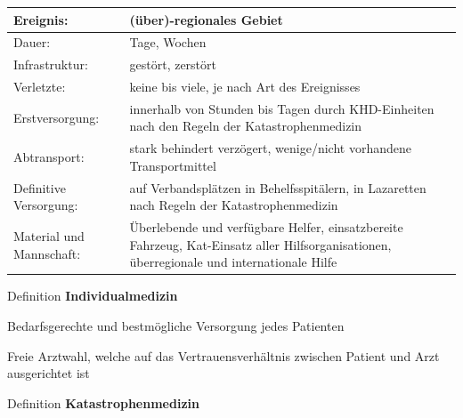 \documentclass{article}
\newcommand\gT[1]{\textbf{\textup{\textcolor[rgb]{0.0,0.5019608,0.0}{#1}}}}
\newcommand\gNw[1]{#1}
\begin{document}
\begin{center}
\begin{tabular}{|m{3.31cm}|m{9.99cm}|}
\hline
{\mdseries Ereignis:}

 &
{\mdseries (\"uber)-regionales Gebiet}

\\\hline
{\mdseries Dauer:}

 &
{\mdseries Tage, Wochen}

\\\hline
{\mdseries Infrastruktur:}

 &
{\mdseries gest\"ort, zerst\"ort}

\\\hline
{\mdseries Verletzte:}

 &
{\mdseries keine bis viele, je nach Art des Ereignisses}

\\\hline
{\mdseries Erstversorgung:}

 &
{\mdseries innerhalb von Stunden bis Tagen durch
KHD\footnotemark{}{}-Einheiten nach den Regeln der Katastrophenmedizin}

\\\hline
{\mdseries Abtransport:}

 &
{\mdseries stark behindert verz\"ogert, wenige/nicht vorhandene
Transportmittel}

\\\hline
{\mdseries Definitive Versorgung:}

 &
{\mdseries auf Verbandspl\"atzen in Behelfsspit\"alern, in Lazaretten
nach Regeln der Katastrophenmedizin}

\\\hline
{\mdseries Material und Mannschaft:}

 &
{\mdseries \"Uberlebende und verf\"ugbare Helfer, einsatzbereite
Fahrzeug, Kat-Einsatz aller Hilfsorganisationen, \"uberregionale und
internationale Hilfe}

\\\hline
\end{tabular}
\end{center}
{\mdseries\color{black}
Definition
\gT{Individualmedizin}}

{\mdseries
Bedarfsgerechte und \gNw{bestm\"ogliche} Versorgung jedes
Patienten }

{\mdseries
Freie Arztwahl, welche auf das Vertrauensverh\"altnis zwischen Patient
und Arzt ausgerichtet ist}

{\mdseries\color{black}
Definition
\gT{Katastrophenmedizin}}
\end{document}
